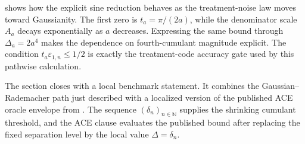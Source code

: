  shows how the explicit sine reduction behaves as the treatment-noise law moves toward Gaussianity. The first zero is \(t_a=\pi/(2a)\), while the denominator scale \(A_a\) decays exponentially as \(a\) decreases. Expressing the same bound through \(\Delta_a=2a^4\) makes the dependence on fourth-cumulant magnitude explicit. The condition \(t_a\varepsilon_{1,n}\le1/2\) is exactly the treatment-code accuracy gate used by this pathwise calculation.

The section closes with a local benchmark statement. It combines the Gaussian--Rademacher path just described with a localized version of the published ACE oracle envelope from \citet{JinMackeySyrgkanis2025}. The sequence \((\delta_n)_{n\in\mathbb N}\) supplies the shrinking cumulant threshold, and the ACE clause evaluates the published bound after replacing the fixed separation level by the local value \(\Delta=\delta_n\).

